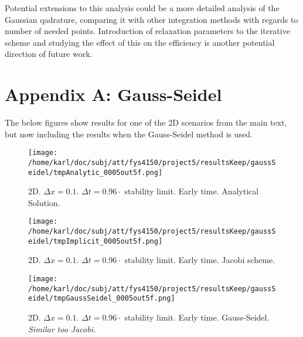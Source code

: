 \documentclass{article}
\begin{document}
Potential extensions to this analysis could be a more detailed analysis of the Gaussian qadrature, comparing it with other integration methods with regards to number of needed points. Introduction of relaxation parameters to the iterative scheme and studying the effect of this on the efficiency is another potential direction of future work.

\section*{Appendix A: Gauss-Seidel}
The below figures show results for one of the 2D scenarios from the main text, but now including the results when the Gauss-Seidel method is used. 

\begin{minipage}{.30\textwidth}
	\begin{figure}[H]
		\centering
		\texttt{[image: /home/karl/doc/subj/att/fys4150/project5/resultsKeep/gaussSeidel/tmpAnalytic\_0005out5f.png]}
		\caption{2D. $\Delta x = 0.1$. $\Delta t = 0.96 \cdot$ stability limit. Early time. Analytical Solution.\\ \textit{}}
		\label{fig:gs1}
	\end{figure}
\end{minipage}\hfill
\begin{minipage}{.30\textwidth} 
	\begin{figure}[H]
		\centering
		\texttt{[image: /home/karl/doc/subj/att/fys4150/project5/resultsKeep/gaussSeidel/tmpImplicit\_0005out5f.png]}
		\caption{2D. $\Delta x = 0.1$. $\Delta t = 0.96 \cdot$ stability limit. Early time. Jacobi scheme.\\ \textit{}}
		\label{fig:gs2}
	\end{figure}
\end{minipage}\hfill
\begin{minipage}{.30\textwidth} 
	\begin{figure}[H]
		\centering
		\texttt{[image: /home/karl/doc/subj/att/fys4150/project5/resultsKeep/gaussSeidel/tmpGaussSeidel\_0005out5f.png]}
		\caption{2D. $\Delta x = 0.1$. $\Delta t = 0.96 \cdot$ stability limit. Early time. Gauss-Seidel.\\ \textit{Similar too Jacobi.}}
		\label{fig:gs3}
	\end{figure}
\end{minipage}\hfill
\vspace{2ex}
\end{document}
